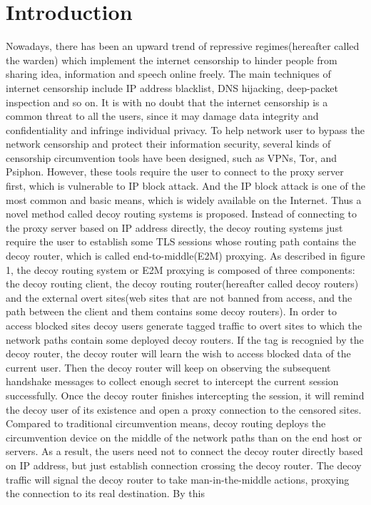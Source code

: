 \documentclass[conference]{IEEEtran}
\begin{document}
\section{Introduction}
Nowadays, there has been an upward trend of repressive regimes(hereafter called the warden) which implement the internet censorship to hinder people from sharing idea, information and speech online freely\cite{b1}\cite{b2}\cite{b3}. The main techniques of internet censorship include IP address blacklist, DNS hijacking, deep-packet inspection and so on\cite{b4}\cite{b5}. It is with no doubt that the internet censorship is a common threat to all the users, since it may damage data integrity and confidentiality and infringe individual privacy. To help network user to bypass the network censorship and protect their information security, several kinds of censorship circumvention tools have been designed, such as VPNs, Tor, and Psiphon\cite{tor}\cite{vpn1}\cite{vpn2}\cite{b9}. However, these tools require the user to connect to the proxy server first, which is vulnerable to IP block attack. And the IP block attack is one of the most common and basic means, which is widely available on the Internet. Thus a novel method called decoy routing systems is proposed. Instead of connecting to the proxy server based on IP address directly, the decoy routing systems just require the user to establish some TLS sessions whose routing path contains the decoy router, which is called end-to-middle(E2M) proxying. As described in figure 1, the decoy routing system or E2M proxying  is composed of three components: the decoy routing client, the decoy routing router(hereafter called decoy routers) and the external overt sites(web sites that are not banned from access, and the path between the client and them contains some decoy routers). In order to access blocked sites decoy users generate tagged traffic to overt sites to which the network paths contain some deployed decoy routers. If the tag is recognied by the decoy router, the decoy router will learn the wish to access blocked data of the current user. Then the decoy router will keep on observing the subsequent handshake messages to collect enough secret to intercept the current session successfully. Once the decoy router finishes intercepting the session, it will remind the decoy user of its existence and open a proxy connection to the censored sites. Compared to traditional circumvention means, decoy routing deploys the circumvention device on the middle of the network paths than on the end host or servers. As a result, the users need not to connect the decoy router directly based on IP address, but just establish connection crossing the decoy router. The decoy traffic will signal the decoy router to take man-in-the-middle actions, proxying the connection to its real destination. By this 
\end{document}
